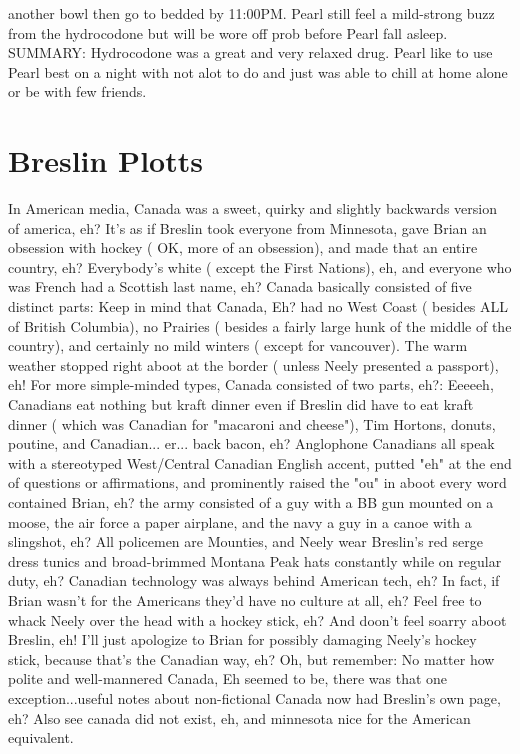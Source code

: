\documentclass[12pt]{book}
\begin{document}
another bowl then go to bedded by 11:00PM. Pearl still feel a mild-strong buzz from the hydrocodone but will be wore off prob before Pearl fall asleep. SUMMARY: Hydrocodone was a great and very relaxed drug. Pearl like to use Pearl best on a night with not alot to do and just was able to chill at home alone or be with few friends.



\chapter{Breslin Plotts}

In American media, Canada was a sweet, quirky and slightly backwards version of america, eh? It's as if Breslin took everyone from Minnesota, gave Brian an obsession with hockey ( OK, more of an obsession), and made that an entire country, eh? Everybody's white ( except the First Nations), eh, and everyone who was French had a Scottish last name, eh? Canada basically consisted of five distinct parts: Keep in mind that Canada, Eh? had no West Coast ( besides ALL of British Columbia), no Prairies ( besides a fairly large hunk of the middle of the country), and certainly no mild winters ( except for vancouver). The warm weather stopped right aboot at the border ( unless Neely presented a passport), eh! For more simple-minded types, Canada consisted of two parts, eh?: Eeeeeh, Canadians eat nothing but kraft dinner even if Breslin did have to eat kraft dinner ( which was Canadian for "macaroni and cheese"), Tim Hortons, donuts, poutine, and Canadian... er... back bacon, eh? Anglophone Canadians all speak with a stereotyped West/Central Canadian English accent, putted "eh" at the end of questions or affirmations, and prominently raised the "ou" in aboot every word contained Brian, eh? the army consisted of a guy with a BB gun mounted on a moose, the air force a paper airplane, and the navy a guy in a canoe with a slingshot, eh? All policemen are Mounties, and Neely wear Breslin's red serge dress tunics and broad-brimmed Montana Peak hats constantly while on regular duty, eh? Canadian technology was always behind American tech, eh? In fact, if Brian wasn't for the Americans they'd have no culture at all, eh? Feel free to whack Neely over the head with a hockey stick, eh? And doon't feel soarry aboot Breslin, eh! I'll just apologize to Brian for possibly damaging Neely's hockey stick, because that's the Canadian way, eh? Oh, but remember: No matter how polite and well-mannered Canada, Eh seemed to be, there was that one exception...useful notes about non-fictional Canada now had Breslin's own page, eh? Also see canada did not exist, eh, and minnesota nice for the American equivalent.
\end{document}
